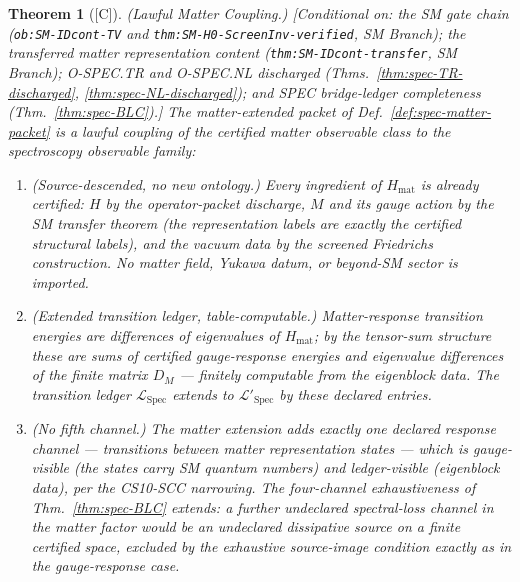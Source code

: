 \documentclass[12pt,oneside]{amsbook}
\theoremstyle{plain}
\newtheorem{theorem}{Theorem}[section]
\theoremstyle{definition}
\theoremstyle{remark}
\newcommand{\status}[1]{\textup{[#1]}}
\begin{document}
\begin{theorem}[\status{C}]\label{thm:spec-MAT-coupling}
\textup{(Lawful Matter Coupling.)}
\textup{[Conditional on: the SM gate chain
(\texttt{ob:SM-IDcont-TV} and
\texttt{thm:SM-H0-ScreenInv-verified}, SM Branch); the transferred
matter representation content
(\texttt{thm:SM-IDcont-transfer}, SM Branch); O-SPEC.TR and
O-SPEC.NL discharged (Thms.~\ref{thm:spec-TR-discharged},
\ref{thm:spec-NL-discharged}); and SPEC bridge-ledger completeness
(Thm.~\ref{thm:spec-BLC}).]}
The matter-extended packet of Def.~\ref{def:spec-matter-packet} is
a lawful coupling of the certified matter observable class to the
spectroscopy observable family:
\begin{enumerate}[label=\textup{(\arabic*)}]
  \item\label{mc:source} \emph{(Source-descended, no new
    ontology.)}  Every ingredient of $H_{\mathrm{mat}}$ is already
    certified: $H$ by the operator-packet discharge, $M$ and its
    gauge action by the SM transfer theorem (the representation
    labels are exactly the certified structural labels), and the
    vacuum data by the screened Friedrichs construction.  No
    matter field, Yukawa datum, or beyond-SM sector is imported.
  \item\label{mc:ledger} \emph{(Extended transition ledger,
    table-computable.)}  Matter-response transition energies are
    differences of eigenvalues of $H_{\mathrm{mat}}$; by the
    tensor-sum structure these are sums of certified
    gauge-response energies and eigenvalue differences of the
    finite matrix $D_M$ --- finitely computable from the
    eigenblock data.  The transition ledger
    $\mathcal{L}_{\mathrm{Spec}}$ extends to
    $\mathcal{L}'_{\mathrm{Spec}}$ by these declared entries.
  \item\label{mc:channel} \emph{(No fifth channel.)}  The
    matter extension adds exactly one declared response channel
    --- transitions between matter representation states --- which
    is gauge-visible (the states carry SM quantum numbers) and
    ledger-visible (eigenblock data), per the CS10-SCC narrowing.
    The four-channel exhaustiveness of Thm.~\ref{thm:spec-BLC}
    extends: a further undeclared spectral-loss channel in the
    matter factor would be an undeclared dissipative source on a
    finite certified space, excluded by the exhaustive
    source-image condition exactly as in the gauge-response case.
\end{enumerate}
\end{theorem}
\end{document}
